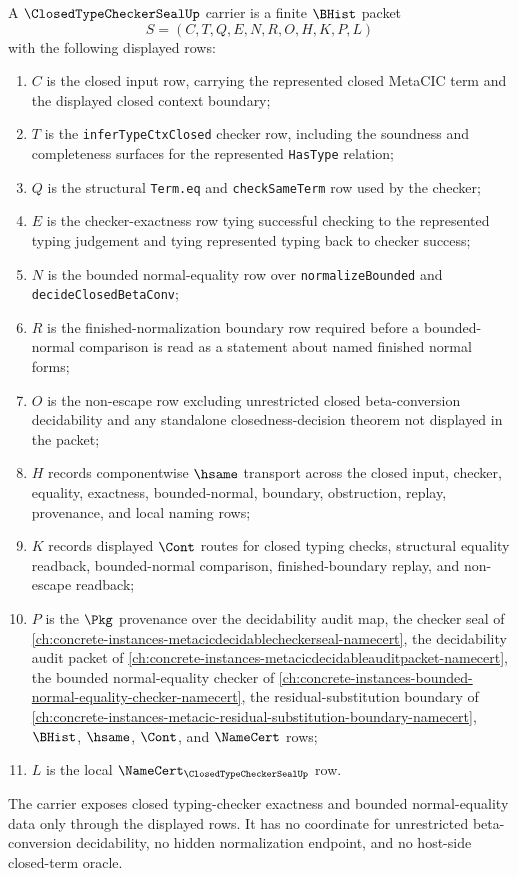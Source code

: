 \begin{definition}
\label{def:closed-type-checker-seal-carrier}
A $\ClosedTypeCheckerSealUp$ carrier is a finite $\BHist$ packet
$$
S=(C,T,Q,E,N,R,O,H,K,P,L)
$$
with the following displayed rows:
\begin{enumerate}
\item $C$ is the closed input row, carrying the represented closed MetaCIC term and the displayed closed context boundary;
\item $T$ is the \texttt{inferTypeCtxClosed} checker row, including the soundness and completeness surfaces for the represented \texttt{HasType} relation;
\item $Q$ is the structural \texttt{Term.eq} and \texttt{checkSameTerm} row used by the checker;
\item $E$ is the checker-exactness row tying successful checking to the represented typing judgement and tying represented typing back to checker success;
\item $N$ is the bounded normal-equality row over \texttt{normalizeBounded} and \texttt{decideClosedBetaConv};
\item $R$ is the finished-normalization boundary row required before a bounded-normal comparison is read as a statement about named finished normal forms;
\item $O$ is the non-escape row excluding unrestricted closed beta-conversion decidability and any standalone closedness-decision theorem not displayed in the packet;
\item $H$ records componentwise $\hsame$ transport across the closed input, checker, equality, exactness, bounded-normal, boundary, obstruction, replay, provenance, and local naming rows;
\item $K$ records displayed $\Cont$ routes for closed typing checks, structural equality readback, bounded-normal comparison, finished-boundary replay, and non-escape readback;
\item $P$ is the $\Pkg$ provenance over the decidability audit map, the checker seal of \autoref{ch:concrete-instances-metacicdecidablecheckerseal-namecert}, the decidability audit packet of \autoref{ch:concrete-instances-metacicdecidableauditpacket-namecert}, the bounded normal-equality checker of \autoref{ch:concrete-instances-bounded-normal-equality-checker-namecert}, the residual-substitution boundary of \autoref{ch:concrete-instances-metacic-residual-substitution-boundary-namecert}, $\BHist$, $\hsame$, $\Cont$, and $\NameCert$ rows;
\item $L$ is the local $\NameCert_{\ClosedTypeCheckerSealUp}$ row.
\end{enumerate}
The carrier exposes closed typing-checker exactness and bounded normal-equality data only through the displayed rows. It has no coordinate for unrestricted beta-conversion decidability, no hidden normalization endpoint, and no host-side closed-term oracle.
\end{definition}

